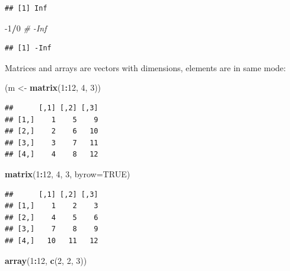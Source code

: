 \documentclass[12pt,]{book}
\newenvironment{Shaded}{\begin{snugshade}}{\end{snugshade}}
\newcommand{\CommentTok}[1]{\textcolor[rgb]{0.56,0.35,0.01}{\textit{#1}}}
\newcommand{\DataTypeTok}[1]{\textcolor[rgb]{0.13,0.29,0.53}{#1}}
\newcommand{\DecValTok}[1]{\textcolor[rgb]{0.00,0.00,0.81}{#1}}
\newcommand{\KeywordTok}[1]{\textcolor[rgb]{0.13,0.29,0.53}{\textbf{#1}}}
\newcommand{\NormalTok}[1]{#1}
\newcommand{\OperatorTok}[1]{\textcolor[rgb]{0.81,0.36,0.00}{\textbf{#1}}}
\newcommand{\OtherTok}[1]{\textcolor[rgb]{0.56,0.35,0.01}{#1}}
\newcommand{\StringTok}[1]{\textcolor[rgb]{0.31,0.60,0.02}{#1}}
\begin{document}
\begin{verbatim}
## [1] Inf
\end{verbatim}

\begin{Shaded}
\begin{Highlighting}[]
\DecValTok{-1}\OperatorTok{/}\DecValTok{0} \CommentTok{# -Inf}
\end{Highlighting}
\end{Shaded}

\begin{verbatim}
## [1] -Inf
\end{verbatim}

Matrices and arrays are vectors with dimensions, elements are in same mode:

\begin{Shaded}
\begin{Highlighting}[]
\NormalTok{(m <-}\StringTok{ }\KeywordTok{matrix}\NormalTok{(}\DecValTok{1}\OperatorTok{:}\DecValTok{12}\NormalTok{, }\DecValTok{4}\NormalTok{, }\DecValTok{3}\NormalTok{))}
\end{Highlighting}
\end{Shaded}

\begin{verbatim}
##      [,1] [,2] [,3]
## [1,]    1    5    9
## [2,]    2    6   10
## [3,]    3    7   11
## [4,]    4    8   12
\end{verbatim}

\begin{Shaded}
\begin{Highlighting}[]
\KeywordTok{matrix}\NormalTok{(}\DecValTok{1}\OperatorTok{:}\DecValTok{12}\NormalTok{, }\DecValTok{4}\NormalTok{, }\DecValTok{3}\NormalTok{, }\DataTypeTok{byrow=}\OtherTok{TRUE}\NormalTok{)}
\end{Highlighting}
\end{Shaded}

\begin{verbatim}
##      [,1] [,2] [,3]
## [1,]    1    2    3
## [2,]    4    5    6
## [3,]    7    8    9
## [4,]   10   11   12
\end{verbatim}

\begin{Shaded}
\begin{Highlighting}[]
\KeywordTok{array}\NormalTok{(}\DecValTok{1}\OperatorTok{:}\DecValTok{12}\NormalTok{, }\KeywordTok{c}\NormalTok{(}\DecValTok{2}\NormalTok{, }\DecValTok{2}\NormalTok{, }\DecValTok{3}\NormalTok{))}
\end{Highlighting}
\end{Shaded}
\end{document}
